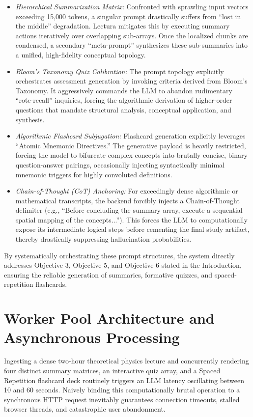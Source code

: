 \begin{itemize}[label=\textendash]
    \item \textit{Hierarchical Summarization Matrix:} Confronted with sprawling input vectors exceeding 15,000 tokens, a singular prompt drastically suffers from ``lost in the middle'' degradation. Lectura mitigates this by executing summary actions iteratively over overlapping sub-arrays. Once the localized chunks are condensed, a secondary ``meta-prompt'' synthesizes these sub-summaries into a unified, high-fidelity conceptual topology.
    \item \textit{Bloom’s Taxonomy Quiz Calibration:} The prompt topology explicitly orchestrates assessment generation by invoking criteria derived from Bloom’s Taxonomy. It aggressively commands the LLM to abandon rudimentary ``rote-recall'' inquiries, forcing the algorithmic derivation of higher-order questions that mandate structural analysis, conceptual application, and synthesis.
    \item \textit{Algorithmic Flashcard Subjugation:} Flashcard generation explicitly leverages ``Atomic Mnemonic Directives.'' The generative payload is heavily restricted, forcing the model to bifurcate complex concepts into brutally concise, binary question-answer pairings, occasionally injecting syntactically minimal mnemonic triggers for highly convoluted definitions.
    \item \textit{Chain-of-Thought (CoT) Anchoring:} For exceedingly dense algorithmic or mathematical transcripts, the backend forcibly injects a Chain-of-Thought delimiter (e.g., ``Before concluding the summary array, execute a sequential spatial mapping of the concepts...''). This forces the LLM to computationally expose its intermediate logical steps before cementing the final study artifact, thereby drastically suppressing hallucination probabilities.
\end{itemize}

By systematically orchestrating these prompt structures, the system directly addresses Objective 3, Objective 5, and Objective 6 stated in the Introduction, ensuring the reliable generation of summaries, formative quizzes, and spaced-repetition flashcards.

\section{Worker Pool Architecture and Asynchronous Processing}
Ingesting a dense two-hour theoretical physics lecture and concurrently rendering four distinct summary matrices, an interactive quiz array, and a Spaced Repetition flashcard deck routinely triggers an LLM latency oscillating between 10 and 60 seconds. Naively binding this computationally brutal operation to a synchronous HTTP request inevitably guarantees connection timeouts, stalled browser threads, and catastrophic user abandonment.

